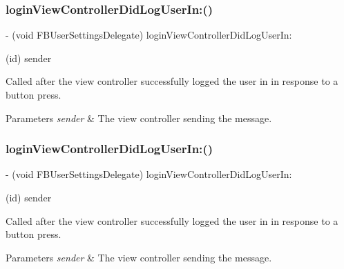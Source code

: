 \subsubsection{\texorpdfstring{login\+View\+Controller\+Did\+Log\+User\+In\+:()}{loginViewControllerDidLogUserIn:()}\hspace{0.1cm}{\footnotesize\ttfamily [2/5]}}
{\footnotesize\ttfamily -\/ (void F\+B\+User\+Settings\+Delegate) login\+View\+Controller\+Did\+Log\+User\+In\+: \begin{DoxyParamCaption}\item[{(id)}]{sender }\end{DoxyParamCaption}\hspace{0.3cm}{\ttfamily [optional]}}

Called after the view controller successfully logged the user in in response to a button press.


\begin{DoxyParams}{Parameters}
{\em sender} & The view controller sending the message. \\
\hline
\end{DoxyParams}
\mbox{\label{protocolFBUserSettingsDelegate_01-p_a66711ccf72e173107d8be71887034d05}} 
\subsubsection{\texorpdfstring{login\+View\+Controller\+Did\+Log\+User\+In\+:()}{loginViewControllerDidLogUserIn:()}\hspace{0.1cm}{\footnotesize\ttfamily [3/5]}}
{\footnotesize\ttfamily -\/ (void F\+B\+User\+Settings\+Delegate) login\+View\+Controller\+Did\+Log\+User\+In\+: \begin{DoxyParamCaption}\item[{(id)}]{sender }\end{DoxyParamCaption}\hspace{0.3cm}{\ttfamily [optional]}}

Called after the view controller successfully logged the user in in response to a button press.


\begin{DoxyParams}{Parameters}
{\em sender} & The view controller sending the message. \\
\hline
\end{DoxyParams}
\mbox{\label{protocolFBUserSettingsDelegate_01-p_a66711ccf72e173107d8be71887034d05}} 
